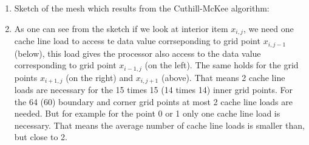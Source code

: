 \documentclass{article}
\begin{document}
\begin{enumerate}[label=(\alph*)]
    \item Sketch of the mesh which results from the Cuthill-McKee algorithm:
    
    \newpage
    
    \item 
 As one can see from the sketch if we look at interior item $x_{i,j}$, we need one cache line load to access te data value corrseponding to grid point $x_{i,j-1}$ (below),  this load gives the processor also access to the data value corresponding to grid point $x_{i-1,j}$ (on the left). The same holds for the grid points $x_{i+1,j}$ (on the right) and $x_{i,j+1}$ (above). That means 2 cache line loads are necessary for the 15 times 15 (14 times 14) inner grid points.
\newline
For the 64 (60) boundary and corner grid points at most 2 cache line loads are needed. But for example for the point 0 or 1 only one cache line load is necessary.
\newline
That means the average number of cache line loads is smaller than, but close to 2. 

\end{enumerate}
\end{document}
